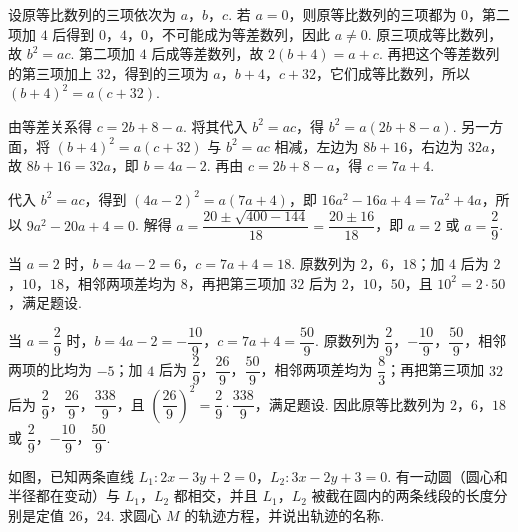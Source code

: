 \begin{solution}
设原等比数列的三项依次为 \(a\)，\(b\)，\(c\). 若 \(a=0\)，则原等比数列的三项都为 \(0\)，第二项加 \(4\) 后得到 \(0\)，\(4\)，\(0\)，不可能成为等差数列，因此 \(a\ne0\). 原三项成等比数列，故 \(b^2=ac\). 第二项加 \(4\) 后成等差数列，故
\(2\left(b+4\right)=a+c\). 再把这个等差数列的第三项加上 \(32\)，得到的三项为 \(a\)，\(b+4\)，\(c+32\)，它们成等比数列，所以
\(\left(b+4\right)^2=a\left(c+32\right)\).

由等差关系得 \(c=2b+8-a\). 将其代入 \(b^2=ac\)，得
\(b^2=a\left(2b+8-a\right)\). 另一方面，将 \(\left(b+4\right)^2=a\left(c+32\right)\) 与 \(b^2=ac\) 相减，左边为 \(8b+16\)，右边为 \(32a\)，故
\(8b+16=32a\)，即 \(b=4a-2\). 再由 \(c=2b+8-a\)，得 \(c=7a+4\).

代入 \(b^2=ac\)，得到
\(\left(4a-2\right)^2=a\left(7a+4\right)\)，即
\(16a^2-16a+4=7a^2+4a\)，所以 \(9a^2-20a+4=0\). 解得
\(a=\dfrac{20\pm\sqrt{400-144}}{18}=\dfrac{20\pm16}{18}\)，即 \(a=2\) 或 \(a=\dfrac29\).

当 \(a=2\) 时，\(b=4a-2=6\)，\(c=7a+4=18\). 原数列为 \(2\)，\(6\)，\(18\)；加 \(4\) 后为 \(2\)，\(10\)，\(18\)，相邻两项差均为 \(8\)，再把第三项加 \(32\) 后为 \(2\)，\(10\)，\(50\)，且 \(10^2=2\cdot50\)，满足题设.

当 \(a=\dfrac29\) 时，\(b=4a-2=-\dfrac{10}{9}\)，\(c=7a+4=\dfrac{50}{9}\). 原数列为 \(\dfrac29\)，\(-\dfrac{10}{9}\)，\(\dfrac{50}{9}\)，相邻两项的比均为 \(-5\)；加 \(4\) 后为 \(\dfrac29\)，\(\dfrac{26}{9}\)，\(\dfrac{50}{9}\)，相邻两项差均为 \(\dfrac83\)；再把第三项加 \(32\) 后为 \(\dfrac29\)，\(\dfrac{26}{9}\)，\(\dfrac{338}{9}\)，且 \(\left(\dfrac{26}{9}\right)^2=\dfrac29\cdot\dfrac{338}{9}\)，满足题设. 因此原等比数列为 \(2\)，\(6\)，\(18\) 或 \(\dfrac29\)，\(-\dfrac{10}{9}\)，\(\dfrac{50}{9}\).
\end{solution}

\begin{problem}
如图，已知两条直线 \(L_{1}: 2x - 3y + 2 = 0\)，\(L_{2}: 3x - 2y + 3 = 0\). 有一动圆（圆心和半径都在变动）与 \(L_{1}\)，\(L_{2}\) 都相交，并且 \(L_{1}\)，\(L_{2}\) 被截在圆内的两条线段的长度分别是定值 \(26\)，\(24\). 求圆心 \(M\) 的轨迹方程，并说出轨迹的名称.
\begin{center}
\end{center}
\end{problem}


